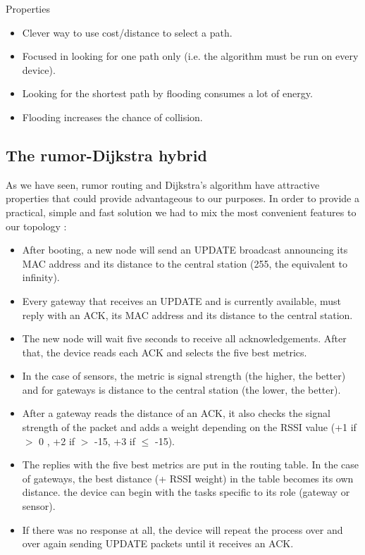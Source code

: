 Properties
\begin{itemize}[noitemsep]
	\item Clever way to use cost/distance to select a path.
	\item Focused in looking for one path only (i.e. the algorithm must be run on every device).
	\item Looking for the shortest path by flooding consumes a lot of energy.
	\item Flooding increases the chance of collision.
\end{itemize}

\subsection{The rumor-Dijkstra hybrid}
As we have seen, rumor routing and Dijkstra's algorithm have attractive properties that could provide advantageous to our purposes. 
In order to provide a practical, simple and fast solution we had to mix the most convenient features to our topology :

\begin{itemize}[noitemsep]
	\item After booting, a new node will send an UPDATE broadcast announcing its MAC address and its distance to the central station (255, the equivalent to infinity).
	\item Every gateway that receives an UPDATE and is currently available, must reply with an ACK, its MAC address and its distance to the central station.
	\item The new node will wait five seconds to receive all acknowledgements. After that, the device reads each ACK and selects the five best metrics. 
	\item In the case of sensors, the metric is signal strength (the higher, the better) and for gateways is distance to the central station (the lower, the better).
	\item After a gateway reads the distance of an ACK, it also checks the signal strength of the packet and adds a weight depending on the RSSI value (+1 if \(>\) 0 , +2 if \(>\) -15, +3 if \(\leq\) -15). 
	\item The replies with the five best metrics are put in the routing table. In the case of gateways, the best distance (+ RSSI weight) in the table becomes its own distance.
	the device can begin with the tasks specific to its role (gateway or sensor).
	\item If there was no response at all, the device will repeat the process over and over again sending UPDATE packets until it receives an ACK.
\end{itemize}

